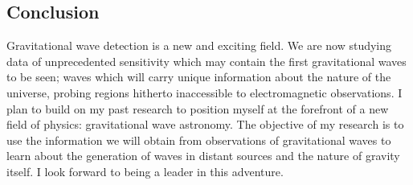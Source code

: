 \subsection{Conclusion}

Gravitational wave detection is a new and exciting field. We are now studying
data of unprecedented sensitivity which may contain the first gravitational
waves to be seen; waves which will carry unique information about the nature
of the universe, probing regions hitherto inaccessible to electromagnetic
observations. I plan to build on my past research to position myself at the
forefront of a new field of physics: gravitational wave astronomy. The
objective of my research is to use the information we will obtain from
observations of gravitational waves to learn about the generation of waves in
distant sources and the nature of gravity itself. I look forward to being a
leader in this adventure.
